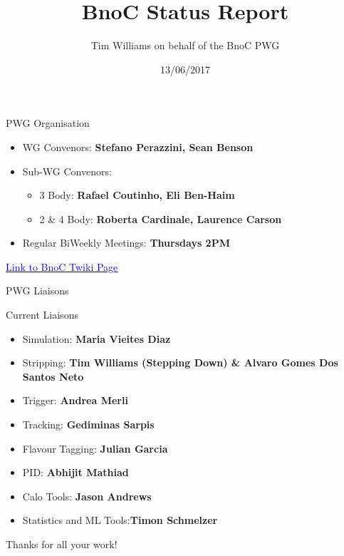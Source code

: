 \documentclass{beamer}
\title[BnoC Status Report]{BnoC Status Report}
\author[Tim Williams]{Tim Williams on behalf of the BnoC PWG}
\institute[Birmingham]{84th \lhcb week}
\date{13/06/2017}
\begin{document}
\begin{frame}
  \titlepage
\end{frame}

\begin{frame}{PWG Organisation}
  \begin{itemize}
  \item WG Convenors: \textbf{Stefano Perazzini, Sean Benson}
  \item Sub-WG Convenors:
    \begin{itemize}
    \item 3 Body: \textbf{Rafael Coutinho, Eli Ben-Haim}
    \item 2 \& 4 Body: \textbf{Roberta Cardinale, Laurence Carson}
    \end{itemize}
  \item Regular BiWeekly Meetings: \textbf{Thursdays 2PM}
  \end{itemize}
  \begin{center}
    \href{https://twiki.cern.ch/twiki/bin/viewauth/LHCbPhysics/BnoCTwikiPage}{\textcolor{blue}{Link to BnoC Twiki Page}}
  \end{center}
\end{frame}

\begin{frame}{PWG Liaisons}
  \begin{exampleblock}{Current Liaisons}
    \begin{itemize}
    \item Simulation: \textbf{Maria Vieites Diaz} \\
    \item Stripping: \textbf{Tim Williams (Stepping Down) \& Alvaro Gomes Dos Santos Neto} \\
    \item Trigger: \textbf{Andrea Merli} \\
    \item Tracking: \textbf{Gediminas Sarpis} \\
    \item Flavour Tagging: \textbf{Julian Garcia} \\
    \item PID: \textbf{Abhijit Mathiad} \\
    \item Calo Tools: \textbf{Jason Andrews} \\
    \item Statistics and ML Tools:\textbf{Timon Schmelzer}
    \end{itemize}
  \end{exampleblock}
  \begin{center}
    \LARGE{Thanks for all your work!}
  \end{center}
\end{frame}
\end{document}
